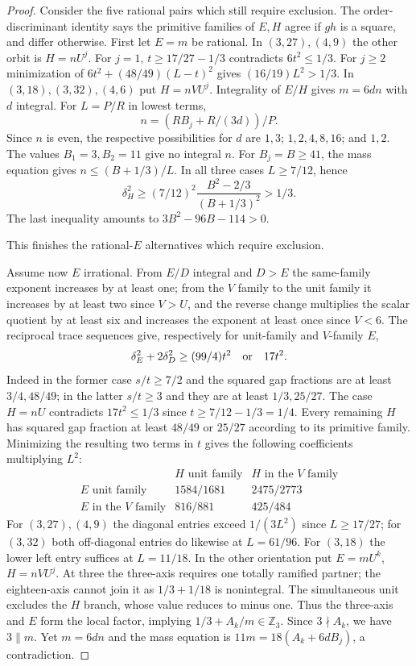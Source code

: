 \documentclass[11pt,reqno]{amsart}
\theoremstyle{remark}\newtheorem{remark}[theorem]{Remark}
\numberwithin{equation}{section}
\begin{document}
\begin{proof}
Consider the five rational pairs which still require exclusion.
The order-discriminant identity says the primitive families of
$E,H$ agree if $gh$ is a square, and differ otherwise. First let
$E=m$ be rational. In $(3,27),(4,9)$ the other orbit is $H=nU^j$.
For $j=1$, $t\ge17/27-1/3$ contradicts $6t^2\le1/3$. For
$j\ge2$ minimization of $6t^2+(48/49)(L-t)^2$ gives
$(16/19)L^2>1/3$. In $(3,18),(3,32),(4,6)$ put $H=nVU^j$.
Integrality of $E/H$ gives $m=6dn$ with $d$ integral. For
$L=P/R$ in lowest terms,
\[
 n=(RB_j+R/(3d))/P.
\]
Since $n$ is even, the respective possibilities for $d$ are
$1,3$; $1,2,4,8,16$; and $1,2$. The values $B_1=3,B_2=11$ give no integral $n$. For $B_j=B\ge41$,
the mass equation gives $n\le(B+1/3)/L$. In all three cases
$L\ge7/12$, hence
\[
 \delta_H^2\ge(7/12)^2\frac{B^2-2/3}{(B+1/3)^2}>1/3.
\]
The last inequality amounts to $3B^2-96B-114>0$.

This finishes the rational-$E$ alternatives which require exclusion.

Assume now $E$ irrational. From $E/D$ integral and $D>E$ the
same-family exponent increases by at least one; from the $V$ family
to the unit family it increases by at least two since $V>U$, and the
reverse change multiplies the scalar quotient by at least six and
increases the exponent at least once since $V<6$. The reciprocal
trace sequences give, respectively for unit-family and $V$-family
$E$,
\[
 \delta_E^2+2\delta_D^2\ge(99/4)t^2\quad\hbox{or}\quad17t^2.
\]
Indeed in the former case $s/t\ge7/2$ and the squared gap fractions
are at least $3/4,48/49$; in the latter $s/t\ge3$ and they are at
least $1/3,25/27$. The case $H=nU$ contradicts $17t^2\le1/3$
since $t\ge7/12-1/3=1/4$. Every remaining $H$ has squared gap
fraction at least $48/49$ or $25/27$ according to its primitive
family. Minimizing the resulting two terms in $t$ gives the following
coefficients multiplying $L^2$:
\[
\begin{array}{c|cc}
 &H\text{ unit family}&H\text{ in the }V\text{ family}\\\hline
 E\text{ unit family}&1584/1681&2475/2773\\
 E\text{ in the }V\text{ family}&816/881&425/484
\end{array}
\]
For $(3,27),(4,9)$ the diagonal entries exceed $1/(3L^2)$ since
$L\ge17/27$; for $(3,32)$ both off-diagonal entries do likewise
at $L=61/96$. For $(3,18)$ the lower left entry suffices at
$L=11/18$. In the other orientation put $E=mU^k$, $H=nVU^j$.
At three the three-axis requires one totally ramified partner; the
eighteen-axis cannot join it as $1/3+1/18$ is nonintegral. The
simultaneous unit excludes the $H$ branch, whose value reduces to
minus one. Thus the three-axis and $E$ form the local factor,
implying $1/3+A_k/m\in\mathbb Z_3$. Since $3\nmid A_k$, we have
$3\parallel m$. Yet $m=6dn$ and the mass equation is
$11m=18(A_k+6d B_j)$, a contradiction.


\end{proof}
\end{document}
